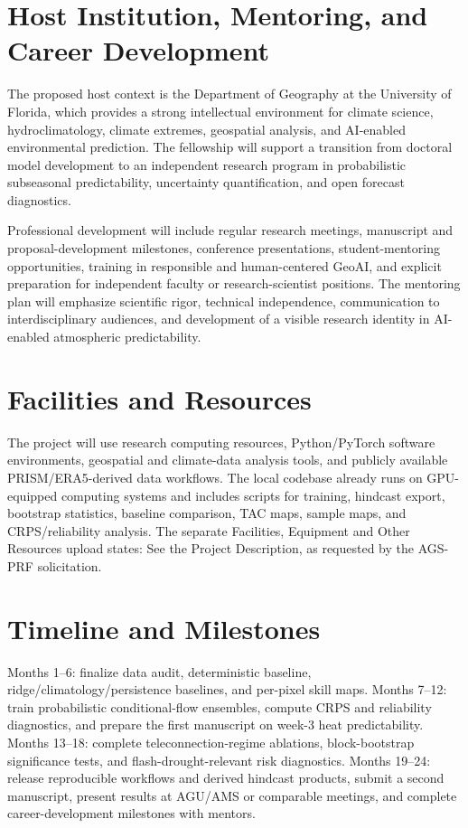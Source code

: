 \documentclass[11pt,letterpaper]{article}
\begin{document}
\section*{Host Institution, Mentoring, and Career Development}
The proposed host context is the Department of Geography at the University of Florida, which provides a strong intellectual environment for climate science, hydroclimatology, climate extremes, geospatial analysis, and AI-enabled environmental prediction. The fellowship will support a transition from doctoral model development to an independent research program in probabilistic subseasonal predictability, uncertainty quantification, and open forecast diagnostics.

Professional development will include regular research meetings, manuscript and proposal-development milestones, conference presentations, student-mentoring opportunities, training in responsible and human-centered GeoAI, and explicit preparation for independent faculty or research-scientist positions. The mentoring plan will emphasize scientific rigor, technical independence, communication to interdisciplinary audiences, and development of a visible research identity in AI-enabled atmospheric predictability.

\section*{Facilities and Resources}
The project will use research computing resources, Python/PyTorch software environments, geospatial and climate-data analysis tools, and publicly available PRISM/ERA5-derived data workflows. The local codebase already runs on GPU-equipped computing systems and includes scripts for training, hindcast export, bootstrap statistics, baseline comparison, TAC maps, sample maps, and CRPS/reliability analysis. The separate Facilities, Equipment and Other Resources upload states: See the Project Description, as requested by the AGS-PRF solicitation.

\section*{Timeline and Milestones}
Months 1--6: finalize data audit, deterministic baseline, ridge/climatology/persistence baselines, and per-pixel skill maps. Months 7--12: train probabilistic conditional-flow ensembles, compute CRPS and reliability diagnostics, and prepare the first manuscript on week-3 heat predictability. Months 13--18: complete teleconnection-regime ablations, block-bootstrap significance tests, and flash-drought-relevant risk diagnostics. Months 19--24: release reproducible workflows and derived hindcast products, submit a second manuscript, present results at AGU/AMS or comparable meetings, and complete career-development milestones with mentors.
\end{document}
